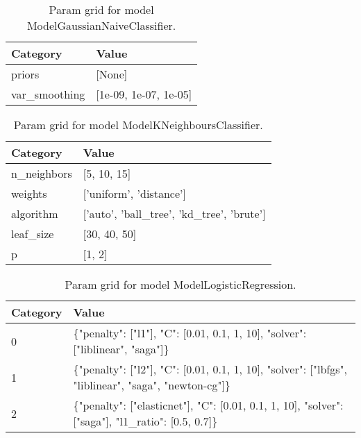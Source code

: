\documentclass{article}%
\begin{document}
%


\begin{table}[H]%
\begin{center}%
\begin{tabular}{l l}%
\hline%
\textbf{Category}&\textbf{Value}\\%
\hline%
priors&{[}None{]}\\%
var\_smoothing&{[}1e{-}09, 1e{-}07, 1e{-}05{]}\\%
\hline%
\end{tabular}%
\end{center}%
\caption{Param grid for model ModelGaussianNaiveClassifier.}%
\end{table}

%


\begin{table}[H]%
\begin{center}%
\begin{tabular}{l l}%
\hline%
\textbf{Category}&\textbf{Value}\\%
\hline%
n\_neighbors&{[}5, 10, 15{]}\\%
weights&{[}'uniform', 'distance'{]}\\%
algorithm&{[}'auto', 'ball\_tree', 'kd\_tree', 'brute'{]}\\%
leaf\_size&{[}30, 40, 50{]}\\%
p&{[}1, 2{]}\\%
\hline%
\end{tabular}%
\end{center}%
\caption{Param grid for model ModelKNeighboursClassifier.}%
\end{table}

%


\begin{table}[H]%
\begin{center}%
\begin{tabular}{l l}%
\hline%
\textbf{Category}&\textbf{Value}\\%
\hline%
0&\{"penalty": {[}"l1"{]}, "C": {[}0.01, 0.1, 1, 10{]}, "solver": {[}"liblinear", "saga"{]}\}\\%
1&\{"penalty": {[}"l2"{]}, "C": {[}0.01, 0.1, 1, 10{]}, "solver": {[}"lbfgs", "liblinear", "saga", "newton{-}cg"{]}\}\\%
2&\{"penalty": {[}"elasticnet"{]}, "C": {[}0.01, 0.1, 1, 10{]}, "solver": {[}"saga"{]}, "l1\_ratio": {[}0.5, 0.7{]}\}\\%
\hline%
\end{tabular}%
\end{center}%
\caption{Param grid for model ModelLogisticRegression.}%
\end{table}
\end{document}
